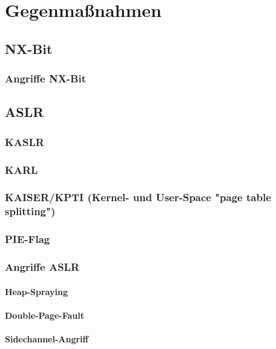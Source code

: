 \documentclass[12pt]{book}
\begin{document}
\chapter{Gegenmaßnahmen}

\section{NX-Bit}

\subsection{Angriffe NX-Bit}

\section{ASLR}

\subsection{KASLR}

\subsection{KARL}

\subsection{KAISER/KPTI (Kernel- und User-Space "page table splitting")}

\subsection{PIE-Flag}

\subsection{Angriffe ASLR}

\subsubsection{Heap-Spraying}

\subsubsection{Double-Page-Fault}

\subsubsection{Sidechannel-Angriff}
\end{document}
